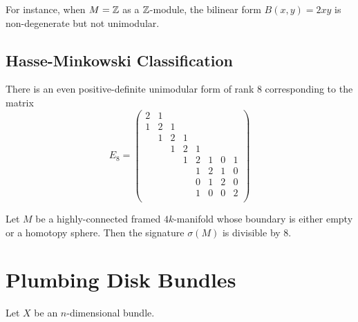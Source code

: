\begin{example}
	For instance, when $M=\mathbb{Z}$ as a $\mathbb{Z}$-module, the bilinear form $B(x,y)=2xy$ is non-degenerate but not unimodular.
\end{example}

\subsection*{Hasse-Minkowski Classification}

\begin{proposition}
	There is an even positive-definite unimodular form of rank $8$ corresponding to the matrix
	\[
		E_8 = \begin{pmatrix}
			2 & 1 &   &   &   &   &   &   \\
			1 & 2 & 1 &   &   &   &   &   \\
			  & 1 & 2 & 1 &   &   &   &   \\
			  &   & 1 & 2 & 1 &   &   &   \\
			  &   &   & 1 & 2 & 1 & 0 & 1 \\
			  &   &   &   & 1 & 2 & 1 & 0 \\
			  &   &   &   & 0 & 1 & 2 & 0 \\
			  &   &   &   & 1 & 0 & 0 & 2 \\
		\end{pmatrix}
	\]
\end{proposition}

%
\begin{definition}
\end{definition}

\begin{theorem}\label{thm:signature_divisible_by_8}
	Let $M$ be a highly-connected framed $4k$-manifold whose boundary is either empty or a homotopy sphere. Then the signature $\sigma(M)$ is divisible by $8$.
\end{theorem}

\section{Plumbing Disk Bundles}

Let $X$ be an $n$-dimensional bundle.


